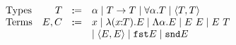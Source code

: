 \[
\begin{array}{lrrl}
  \text{Types} & T & \dcoloneq &
    \alpha
    \mid T \to T
    \mid \forall \alpha. T
    \mid \tupled {T, T} \\

  \text{Terms} & E, C & \dcoloneq &
    x
    \mid \abs {\rel x T} {E}
    \mid \Abs {\alpha} {E}
    \mid \app E E
    \mid \app E T \\ & & &
    \mid \tupled {E, E}
    \mid \fst E
    \mid \snd E
\end{array}
\]
